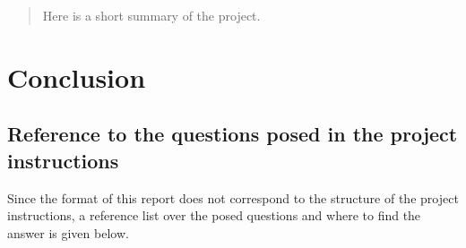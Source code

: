 \documentclass[a4paper,10pt,english]{article}
\numberwithin{figure}{subsection}
\numberwithin{table}{subsection}
\numberwithin{equation}{subsection}
\begin{document}
\begin{abstract}
Here is a short summary of the project.
\end{abstract}

\hypersetup{linkcolor=black}
\tableofcontents 
\hypersetup{linkcolor=red}
\clearpage









\section{Conclusion}

\clearpage
{}


\clearpage
\begin{appendices}

\section{Reference to the questions posed in the project instructions}

Since the format of this report does not correspond to the structure of the project instructions, a reference list over the posed questions and where to find the answer is given below. 



\end{appendices}
\end{document}
